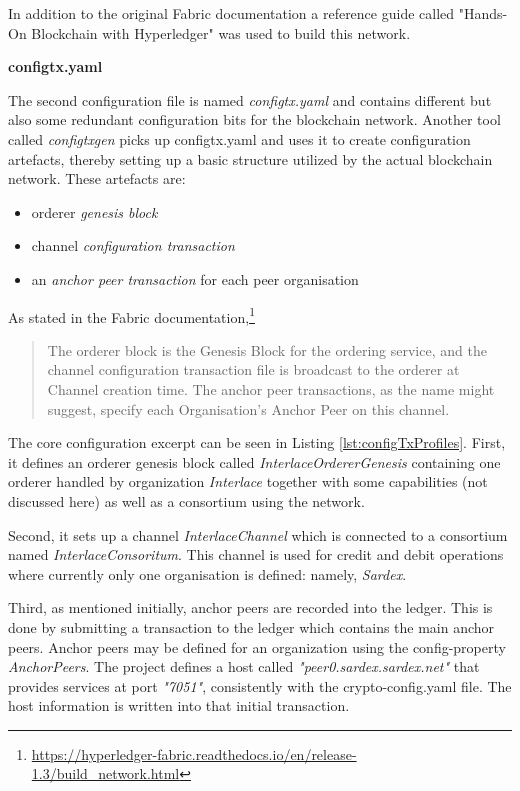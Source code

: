 In addition to the original Fabric documentation a reference guide called "Hands-On Blockchain with Hyperledger" \cite{HandsOnBlockchainHyperledger2018} was used to build this network.

\textbf{configtx.yaml}

The second configuration file is named \textit{configtx.yaml} and contains different but also some redundant configuration bits for the blockchain network. Another tool called \textit{configtxgen} picks up configtx.yaml and uses it to create configuration artefacts, thereby setting up a basic structure utilized by the actual blockchain network. These artefacts are:

\begin{itemize}
	\item orderer \textit{genesis block}
	\item channel \textit{configuration transaction}
	\item an \textit{anchor peer transaction} for each peer organisation
\end{itemize}

As stated in the Fabric documentation,\footnote{\url{https://hyperledger-fabric.readthedocs.io/en/release-1.3/build_network.html}}
\begin{quote}
\small
The orderer block is the Genesis Block for the ordering service, and the channel configuration transaction file is broadcast to the orderer at Channel creation time. The anchor peer transactions, as the name might suggest, specify each Organisation's Anchor Peer on this channel.
\end{quote}

The core configuration excerpt can be seen in Listing \ref{lst:configTxProfiles}. First, it defines an orderer genesis block called \textit{InterlaceOrdererGenesis} containing one orderer handled by organization \textit{Interlace} together with some capabilities (not discussed here) as well as a consortium using the network.

Second, it sets up a channel \textit{InterlaceChannel} which is connected to a consortium named \textit{InterlaceConsoritum}. This channel is used for credit and debit operations where currently only one organisation is defined: namely, \textit{Sardex}.

Third, as mentioned initially, anchor peers are recorded into the ledger. This is done by submitting a transaction to the ledger which contains the main anchor peers. Anchor peers may be defined for an organization using the config-property \textit{AnchorPeers}. The project defines a host called \textit{"peer0.sardex.sardex.net"} that provides services at port \textit{"7051"}, consistently with the crypto-config.yaml file. The host information is written into that initial transaction.

